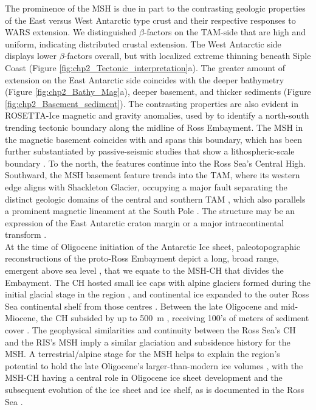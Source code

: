 The prominence of the MSH is due in part to the contrasting geologic properties of the East versus West Antarctic type crust and their respective responses to WARS extension. We distinguished $\beta$-factors on the TAM-side that are high and uniform, indicating distributed crustal extension. The West Antarctic side displays lower $\beta$-factors overall, but with localized extreme thinning beneath Siple Coast (Figure \ref{fig:chp2_Tectonic_interpretation}a). The greater amount of extension on the East Antarctic side coincides with the deeper bathymetry (Figure \ref{fig:chp2_Bathy_Mag}a), deeper basement, and thicker sediments (Figure \ref{fig:chp2_Basement_sediment}). The contrasting properties are also evident in ROSETTA-Ice magnetic and gravity anomalies, used by \citet{tintoross2019} to identify a north-south trending tectonic boundary along the midline of Ross Embayment. The MSH in the magnetic basement coincides with and spans this boundary, which has been further substantiated by passive-seismic studies that show a lithospheric-scale boundary \citep{chenganisotropy2021, white-gaynorheterogeneous2019}. To the north, the features continue into the Ross Sea’s Central High. Southward, the MSH basement feature trends into the TAM, where its western edge aligns with Shackleton Glacier, occupying a major fault separating the distinct geologic domains of the central and southern TAM \citep{borgisotopic1990, paulsenstructure2004}, which also parallels a prominent magnetic lineament at the South Pole \citep{studingercrustal2006}. The structure may be an expression of the East Antarctic craton margin or a major intracontinental transform \citep[Figure \ref{fig:chp2_Tectonic_interpretation}a,][]{studingercrustal2006}. \\

At the time of Oligocene initiation of the Antarctic Ice sheet, paleotopographic reconstructions of the proto-Ross Embayment depict a long, broad range, emergent above sea level \citep{paxmanreconstructions2019, wilsonantarctic2012}, that we equate to the MSH-CH that divides the Embayment. The CH hosted small ice caps with alpine glaciers formed during the initial glacial stage in the region \citep{desantisseismic1995}, and continental ice expanded to the outer Ross Sea continental shelf from those centres \citep{bartglacial2012}. Between the late Oligocene and mid-Miocene, the CH subsided by up to 500~m \citep{leckielate1983, kulhanekrevised2019}, receiving 100’s of meters of sediment cover \citep[$\sim$400~m at DSDP 270;][]{desantisseismic1995}. The geophysical similarities and continuity between the Ross Sea’s CH and the RIS’s MSH imply a similar glaciation and subsidence history for the MSH. A terrestrial/alpine stage for the MSH helps to explain the region’s potential to hold the late Oligocene’s larger-than-modern ice volumes \citep{wilsoninitiation2013, pekarresolving2006}, with the MSH-CH having a central role in Oligocene ice sheet development and the subsequent evolution of the ice sheet and ice shelf, as is documented in the Ross Sea \citep{halberstadticesheet2016}.

